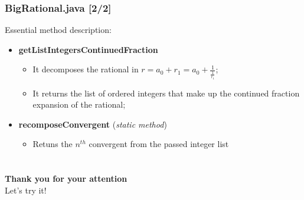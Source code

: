 \documentclass{beamer}
\begin{document}
    \begin{frame}
  \frametitle{BigRational.java [2/2]}
    Essential method description:
   
   \begin{itemize}
   \item \textbf{getListIntegersContinuedFraction}
   \begin{itemize}
   		\item It decomposes the rational in $r = a_0 + r_1 = a_0 + \frac{1}{\frac{1}{r_1}}$;
   		\item It returns the list of ordered integers that make up the continued fraction expansion of the rational;
   \end{itemize}
   \item \textbf{recomposeConvergent} (\textit{static method})
   \begin{itemize}
   \item Retuns the ${n}^{th}$ convergent from  the passed integer list
   \end{itemize}
   \end{itemize}
    
  \end{frame}
  
  \section*{}
  
    \begin{frame}
    \begin{center}
           \textbf{Thank you for your attention}\\
           Let's try it!
    \end{center}
  \end{frame}
\end{document}
